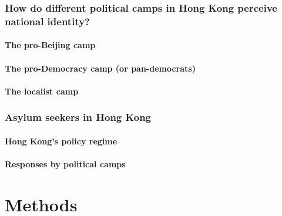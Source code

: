 \documentclass[a4paper, oneside]{report}
\begin{document}
\hypertarget{how-do-different-political-camps-in-hong-kong-perceive-national-identity}{%
\subsection{How do different political camps in Hong Kong perceive
national
identity?}\label{how-do-different-political-camps-in-hong-kong-perceive-national-identity}}

\hypertarget{the-pro-beijing-camp}{%
\subsubsection{The pro-Beijing camp}\label{the-pro-beijing-camp}}

\hypertarget{the-pro-democracy-camp-or-pan-democrats}{%
\subsubsection{The pro-Democracy camp (or
pan-democrats)}\label{the-pro-democracy-camp-or-pan-democrats}}

\hypertarget{the-localist-camp}{%
\subsubsection{The localist camp}\label{the-localist-camp}}

\hypertarget{asylum-seekers-in-hong-kong}{%
\subsection{Asylum seekers in Hong
Kong}\label{asylum-seekers-in-hong-kong}}

\hypertarget{hong-kongs-policy-regime}{%
\subsubsection{Hong Kong's policy
regime}\label{hong-kongs-policy-regime}}

\hypertarget{responses-by-political-camps}{%
\subsubsection{Responses by political
camps}\label{responses-by-political-camps}}

\hypertarget{methods}{%
\chapter{Methods}\label{methods}}
\end{document}
